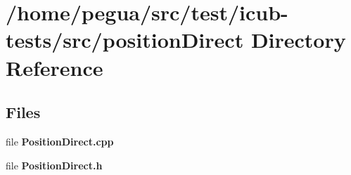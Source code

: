 \section{/home/pegua/src/test/icub-\/tests/src/position\-Direct Directory Reference}
\label{dir_de7c96bd180ef87bf5425ed419472c36}
\subsection*{Files}
\begin{DoxyCompactItemize}
\item 
file {\bfseries Position\-Direct.\-cpp}
\item 
file {\bfseries Position\-Direct.\-h}
\end{DoxyCompactItemize}
